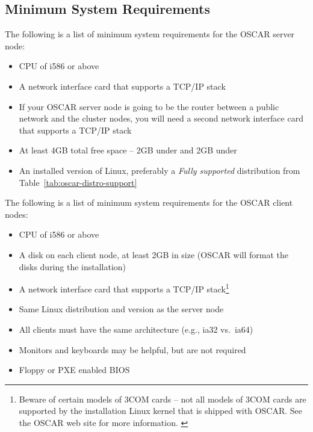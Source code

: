 


\subsection{Minimum System Requirements}
\label{sec:intro-min-sys}


The following is a list of minimum system requirements for the OSCAR
server node:

\begin{itemize}
\item CPU of i586 or above
\item A network interface card that supports a TCP/IP stack
\item If your OSCAR server node is going to be the router between a
  public network and the cluster nodes, you will need a second
  network interface card that supports a TCP/IP stack
\item At least 4GB total free space -- 2GB under \file{/} and 2GB
  under 
\item An installed version of Linux, preferably a {\em Fully
    supported} distribution from Table~\ref{tab:oscar-distro-support}
\end{itemize}

\noindent The following is a list of minimum system requirements for
the OSCAR client nodes:

\begin{itemize}
\item CPU of i586 or above
\item A disk on each client node, at least 2GB in size (OSCAR will
  format the disks during the installation)
\item A network interface card that supports a TCP/IP
  stack\footnote{Beware of certain models of 3COM cards -- not all
    models of 3COM cards are supported by the installation Linux
    kernel that is shipped with OSCAR.  See the OSCAR web site for
    more information. \label{foot:3com-warning}}
\item Same Linux distribution and version as the server node
\item All clients must have the same architecture (e.g., ia32 vs.\ 
  ia64)
\item Monitors and keyboards may be helpful, but are not required
\begchange
\item Floppy or PXE enabled BIOS
\endchange

\end{itemize}


